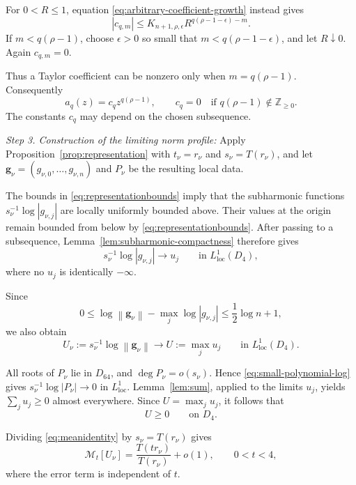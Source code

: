\documentclass[12pt,letterpaper,reqno]{amsart}
\theoremstyle{definition}
\numberwithin{equation}{section}
\newcommand{\Z}{\mathbb Z}
\newcommand{\loc}{\mathrm{loc}}
\newcommand{\mean}[2]{\mathcal M_{#1}\!\left[#2\right]}
\newcommand{\norm}[1]{\left\lVert#1\right\rVert}
\newcommand{\gv}{\bm g}
\begin{document}
For \(0<R\leq1\), equation
\eqref{eq:arbitrary-coefficient-growth} instead gives
\[
|c_{q,m}|
\leq
K_{{n+1},\rho,\epsilon}
R^{q(\rho-1-\epsilon)-m}.
\]
If \(m<q(\rho-1)\), choose \(\epsilon>0\) so small that
\(m<q(\rho-1-\epsilon)\), and let \(R\downarrow0\). Again
\(c_{q,m}=0\).

Thus a Taylor coefficient can be nonzero only when
\(m=q(\rho-1)\). Consequently
\begin{equation}\label{eq:monomial-coefficients}
 a_q(z)
 =
 c_qz^{q(\rho-1)},
 \qquad
 c_q=0
 \quad\text{if }q(\rho-1)\notin\Z_{\geq0}.
\end{equation}
The constants \(c_q\) may depend on the chosen subsequence.


\medskip\noindent
\emph{{Step 3. Construction of the limiting norm profile:}}
Apply Proposition~\ref{prop:representation} with
\(t_\nu=r_\nu\) and \(s_\nu=T(r_\nu)\), and let
\(\gv_\nu=(g_{\nu,0},\ldots,g_{\nu,n})\) and \(P_\nu\) be the
resulting local data.

The bounds in \eqref{eq:representationbounds} imply that the
subharmonic functions
\(s_\nu^{-1}\log|g_{\nu,j}|\) are locally uniformly bounded above.
Their values at the origin remain bounded from below by
\eqref{eq:representationbounds}. After passing to a subsequence,
Lemma~\ref{lem:subharmonic-compactness} therefore gives
\[
s_\nu^{-1}\log|g_{\nu,j}|
\longrightarrow u_j
\qquad\text{in }L^1_{\loc}(D_4),
\]
where no \(u_j\) is identically \(-\infty\).

Since
\[
0\leq
\log\norm{\gv_\nu}
-
\max_j\log|g_{\nu,j}|
\leq
\frac12\log {n+1},
\]
we also obtain
\begin{equation}\label{eq:norm-limit}
 U_\nu
 :=
 s_\nu^{-1}\log\norm{\gv_\nu}
 \longrightarrow
 U:=\max_j u_j
 \qquad\text{in }L^1_{\loc}(D_4).
\end{equation}

All roots of \(P_\nu\) lie in \(D_{64}\), and
\(\deg P_\nu=o(s_\nu)\). Hence
\eqref{eq:small-polynomial-log} gives
\(s_\nu^{-1}\log|P_\nu|\to0\) in \(L^1_{\loc}\).
Lemma~\ref{lem:sum}, applied to the limits \(u_j\), yields
\(\sum_j u_j\geq0\) almost everywhere. Since
\(U=\max_j u_j\), it follows that
\begin{equation}\label{eq:U-nonnegative}
 U\geq0
 \qquad\text{on }D_4.
\end{equation}

Dividing \eqref{eq:meanidentity} by \(s_\nu=T(r_\nu)\) gives
\begin{equation}\label{eq:radial-mean}
 \mean t{U_\nu}
 =
 \frac{T(tr_\nu)}{T(r_\nu)}
 +
 o(1),
 \qquad
 0<t<4,
\end{equation}
where the error term is independent of \(t\).
\end{document}
